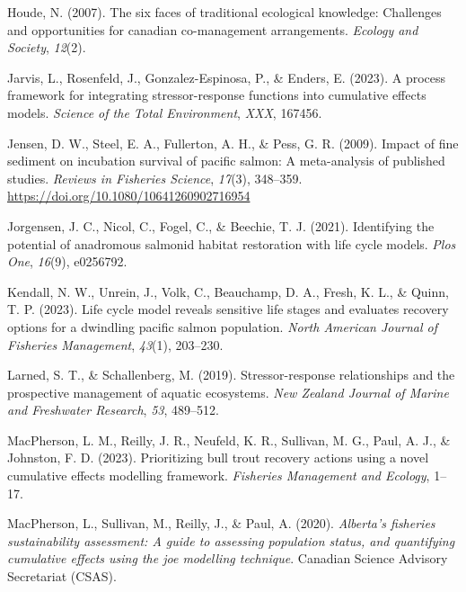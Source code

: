 \documentclass[
  letterpaper,
  DIV=11,
  numbers=noendperiod]{scrreprt}
\newlength{\cslhangindent}
\newenvironment{CSLReferences}[2] %
 {\begin{list}{}{%
  \setlength{\itemindent}{0pt}
  \setlength{\leftmargin}{0pt}
  \setlength{\parsep}{0pt}
  \ifodd #1
   \setlength{\leftmargin}{\cslhangindent}
   \setlength{\itemindent}{-1\cslhangindent}
  \fi
  \setlength{\itemsep}{#2\baselineskip}}}
 {\end{list}}
\begin{document}
\begin{CSLReferences}{1}{0}
Houde, N. (2007). The six faces of traditional ecological knowledge:
Challenges and opportunities for canadian co-management arrangements.
\emph{Ecology and Society}, \emph{12}(2).

Jarvis, L., Rosenfeld, J., Gonzalez-Espinosa, P., \& Enders, E. (2023).
A process framework for integrating stressor-response functions into
cumulative effects models. \emph{Science of the Total Environment},
\emph{XXX}, 167456.

Jensen, D. W., Steel, E. A., Fullerton, A. H., \& Pess, G. R. (2009).
Impact of fine sediment on incubation survival of pacific salmon: A
meta-analysis of published studies. \emph{Reviews in Fisheries Science},
\emph{17}(3), 348--359. \url{https://doi.org/10.1080/10641260902716954}

Jorgensen, J. C., Nicol, C., Fogel, C., \& Beechie, T. J. (2021).
Identifying the potential of anadromous salmonid habitat restoration
with life cycle models. \emph{Plos One}, \emph{16}(9), e0256792.

Kendall, N. W., Unrein, J., Volk, C., Beauchamp, D. A., Fresh, K. L., \&
Quinn, T. P. (2023). Life cycle model reveals sensitive life stages and
evaluates recovery options for a dwindling pacific salmon population.
\emph{North American Journal of Fisheries Management}, \emph{43}(1),
203--230.

Larned, S. T., \& Schallenberg, M. (2019). Stressor-response
relationships and the prospective management of aquatic ecosystems.
\emph{New Zealand Journal of Marine and Freshwater Research}, \emph{53},
489--512.

MacPherson, L. M., Reilly, J. R., Neufeld, K. R., Sullivan, M. G., Paul,
A. J., \& Johnston, F. D. (2023). Prioritizing bull trout recovery
actions using a novel cumulative effects modelling framework.
\emph{Fisheries Management and Ecology}, 1--17.

MacPherson, L., Sullivan, M., Reilly, J., \& Paul, A. (2020).
\emph{Alberta's fisheries sustainability assessment: A guide to
assessing population status, and quantifying cumulative effects using
the joe modelling technique}. Canadian Science Advisory Secretariat
(CSAS).


\end{CSLReferences}
\end{document}
